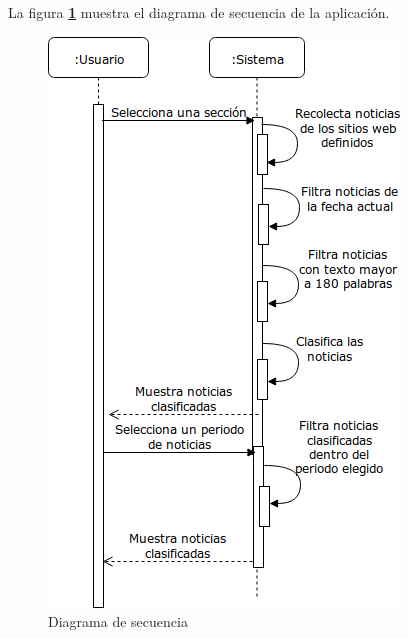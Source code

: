 


La figura \textbf{\ref{fig:DSE}} muestra el diagrama de secuencia de la aplicación. 

\begin{figure}[H]
  \centering
  \includegraphics[scale=.75]{imagenes/Diagramas/Secuencia/Diagrama}
  \caption{Diagrama de secuencia}
  \label{fig:DSE}
\end{figure}
